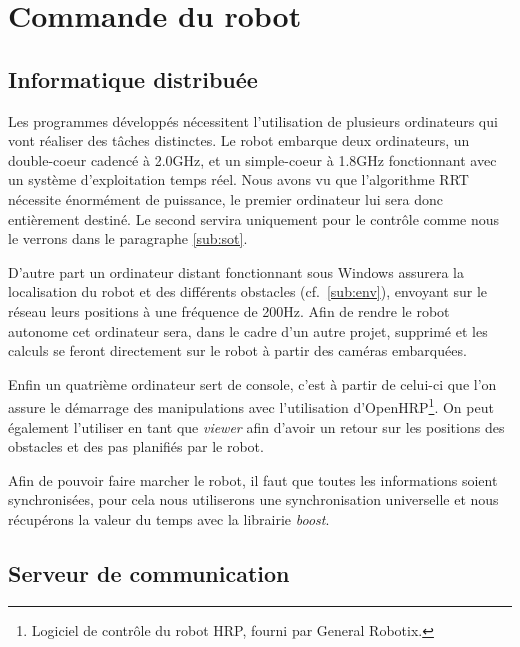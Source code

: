 \section{Commande du robot}
\label{sec:control}

\subsection{Informatique distribuée}
\label{sub:distributed}

Les programmes développés nécessitent l'utilisation de plusieurs ordinateurs qui vont réaliser des tâches distinctes.
Le robot embarque deux ordinateurs, un double-coeur cadencé à 2.0GHz, et un simple-coeur à 1.8GHz fonctionnant avec un système d'exploitation temps réel.
Nous avons vu que l'algorithme RRT nécessite énormément de puissance, le premier ordinateur lui sera donc entièrement destiné.
Le second servira uniquement pour le contrôle comme nous le verrons dans le paragraphe \ref{sub:sot}.

D'autre part un ordinateur distant fonctionnant sous Windows assurera la localisation du robot et des différents obstacles (cf.~\ref{sub:env}), envoyant sur le réseau leurs positions à une fréquence de 200Hz. Afin de rendre le robot autonome cet ordinateur sera, dans le cadre d'un autre projet, supprimé et les calculs se feront directement sur le robot à partir des caméras embarquées.

Enfin un quatrième ordinateur sert de console, c'est à partir de celui-ci que l'on assure le démarrage des manipulations avec l'utilisation d'OpenHRP\footnote{Logiciel de contrôle du robot HRP, fourni par General Robotix.}. On peut également l'utiliser en tant que \emph{viewer} afin d'avoir un retour sur les positions des obstacles et des pas planifiés par le robot.

Afin de pouvoir faire marcher le robot, il faut que toutes les informations soient synchronisées, pour cela nous utiliserons une synchronisation universelle et nous récupérons la valeur du temps avec la librairie \emph{boost}.


\subsection{Serveur de communication}
\label{sub:corba}

